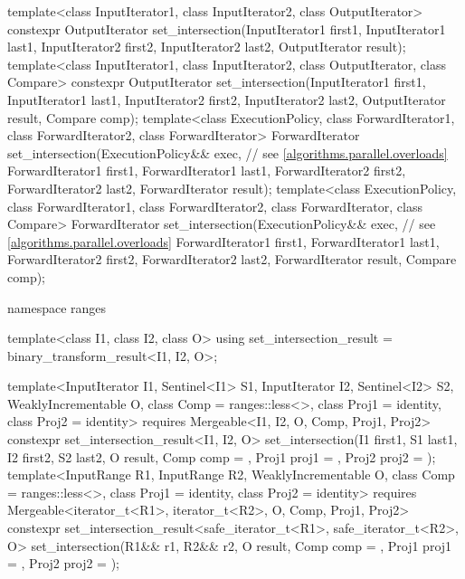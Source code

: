 \begin{codeblock}
{  template<class InputIterator1, class InputIterator2, class OutputIterator>
    constexpr OutputIterator
      set_intersection(InputIterator1 first1, InputIterator1 last1,
                       InputIterator2 first2, InputIterator2 last2,
                       OutputIterator result);
  template<class InputIterator1, class InputIterator2, class OutputIterator, class Compare>
    constexpr OutputIterator
      set_intersection(InputIterator1 first1, InputIterator1 last1,
                       InputIterator2 first2, InputIterator2 last2,
                       OutputIterator result, Compare comp);
  template<class ExecutionPolicy, class ForwardIterator1, class ForwardIterator2,
           class ForwardIterator>
    ForwardIterator
      set_intersection(ExecutionPolicy&& exec, // see \ref{algorithms.parallel.overloads}
                       ForwardIterator1 first1, ForwardIterator1 last1,
                       ForwardIterator2 first2, ForwardIterator2 last2,
                       ForwardIterator result);
  template<class ExecutionPolicy, class ForwardIterator1, class ForwardIterator2,
           class ForwardIterator, class Compare>
    ForwardIterator
      set_intersection(ExecutionPolicy&& exec, // see \ref{algorithms.parallel.overloads}
                       ForwardIterator1 first1, ForwardIterator1 last1,
                       ForwardIterator2 first2, ForwardIterator2 last2,
                       ForwardIterator result, Compare comp);

  namespace ranges {
    template<class I1, class I2, class O>
    using set_intersection_result = binary_transform_result<I1, I2, O>;

    template<InputIterator I1, Sentinel<I1> S1, InputIterator I2, Sentinel<I2> S2,
             WeaklyIncrementable O, class Comp = ranges::less<>,
             class Proj1 = identity, class Proj2 = identity>
      requires Mergeable<I1, I2, O, Comp, Proj1, Proj2>
      constexpr set_intersection_result<I1, I2, O>
        set_intersection(I1 first1, S1 last1, I2 first2, S2 last2, O result,
                         Comp comp = {}, Proj1 proj1 = {}, Proj2 proj2 = {});
    template<InputRange R1, InputRange R2, WeaklyIncrementable O,
             class Comp = ranges::less<>, class Proj1 = identity, class Proj2 = identity>
      requires Mergeable<iterator_t<R1>, iterator_t<R2>, O, Comp, Proj1, Proj2>
      constexpr set_intersection_result<safe_iterator_t<R1>, safe_iterator_t<R2>, O>
        set_intersection(R1&& r1, R2&& r2, O result,
                         Comp comp = {}, Proj1 proj1 = {}, Proj2 proj2 = {});
  }

}
\end{codeblock}
